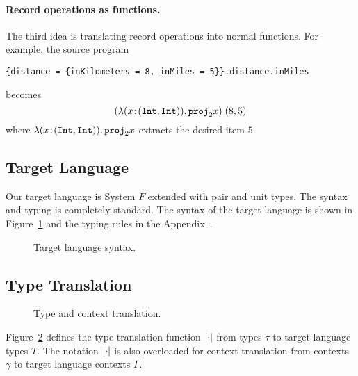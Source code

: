 \paragraph{Record operations as functions.}
The third idea is translating record operations into normal functions. For
example, the source program
\begin{lstlisting}
{distance = {inKilometers = 8, inMiles = 5}}.distance.inMiles
\end{lstlisting}
becomes
\[
(\lambda (x \!:\! (\texttt{Int}, \texttt{Int})).\, {\texttt{proj}}_{2} x) \; (8, 5)
\]
where $\lambda (x \!:\! (\texttt{Int}, \texttt{Int})).\, {\texttt{proj}}_{2} x$
extracts the desired item $5$.

\subsection{Target Language}

Our target language is System $F$ extended with pair and unit types. The syntax
and typing is completely standard. The syntax of the target language is shown in
Figure~\ref{fig:f-syntax} and the typing rules in the Appendix~.
\begin{figure}[h]
  
  \caption{Target language syntax.}
  \label{fig:f-syntax}
\end{figure}



\subsection{Type Translation}

\begin{figure}[h]


\caption{Type and context translation.}
\label{fig:type-and-context-translation}
\end{figure}

Figure~\ref{fig:type-and-context-translation} defines the type translation
function $\lvert \cdot \rvert$ from \name types $\tau$ to target language types $T$. The
notation $\lvert \cdot \rvert$ is also overloaded for context translation from \name
contexts $\gamma$ to target language contexts $\Gamma$.

